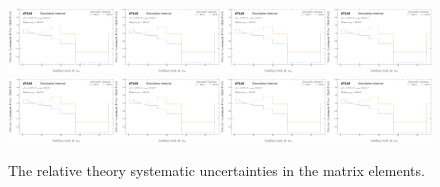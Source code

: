 \begin{figure}[h!]
\includegraphics[width=0.25\textwidth,page=17]{figures/SimResults/MultiFold_QCD_SystEffect.pdf}\includegraphics[width=0.25\textwidth,page=18]{figures/SimResults/MultiFold_QCD_SystEffect.pdf}\includegraphics[width=0.25\textwidth,page=19]{figures/SimResults/MultiFold_QCD_SystEffect.pdf}\includegraphics[width=0.25\textwidth,page=20]{figures/SimResults/MultiFold_QCD_SystEffect.pdf}\\
\includegraphics[width=0.25\textwidth,page=21]{figures/SimResults/MultiFold_QCD_SystEffect.pdf}\includegraphics[width=0.25\textwidth,page=22]{figures/SimResults/MultiFold_QCD_SystEffect.pdf}\includegraphics[width=0.25\textwidth,page=23]{figures/SimResults/MultiFold_QCD_SystEffect.pdf}\includegraphics[width=0.25\textwidth,page=24]{figures/SimResults/MultiFold_QCD_SystEffect.pdf}
\caption{The relative theory systematic uncertainties in the matrix elements.}
\label{fig:simresultsmulti_theoryQCDuncertsl}
\end{figure}
